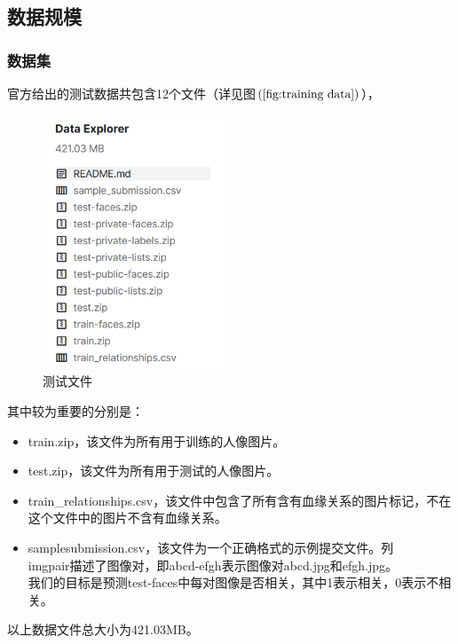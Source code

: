 \documentclass[UTF8]{ctexart}
\begin{document}
\subsection{数据规模}
\subsubsection{数据集}
官方给出的测试数据共包含12个文件（详见图$\left(\ref{fig:training data}\right)$），

\begin{figure}[!ht]
  \centering
  \includegraphics[width=0.5\textwidth]{training data.jpg}
  \caption{测试文件}
  \label{fig:training data}
\end{figure}
其中较为重要的分别是：
\begin{itemize}
  \item train.zip，该文件为所有用于训练的人像图片。
  \item test.zip，该文件为所有用于测试的人像图片。
  \item train\_relationships.csv，该文件中包含了所有含有血缘关系的图片标记，不在这个文件中的图片不含有血缘关系。
  \item sample\underline{\space}submission.csv，该文件为一个正确格式的示例提交文件。列\\
  img\underline{\space}pair描述了图像对，即abcd-efgh表示图像对abcd.jpg和efgh.jpg。\\
  我们的目标是预测test-faces中每对图像是否相关，其中1表示相关，0表示不相关。
\end{itemize}

以上数据文件总大小为421.03MB。
\end{document}

